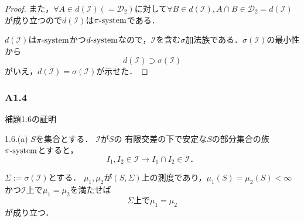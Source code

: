 \documentclass{jsarticle}
\begin{document}
\begin{proof}
    また，$\forall A\in d(\mathcal{I})(=\mathcal{D}_2)$に対して$\forall B\in d(\mathcal{I}),A\cap B\in \mathcal{D}_2=d(\mathcal{I})$が成り立つので$d(\mathcal{I})$は$\pi{\rm \text{-}system}$である．
    
    $d(\mathcal{I})$は$\pi{\rm \text{-}system}$かつ$d{\rm \text{-}system}$なので，$\mathcal{I}$を含む$\sigma$加法族である．$\sigma(\mathcal{I})$の最小性から
    \begin{equation}
        d(\mathcal{I})\supset\sigma(\mathcal{I}) \nonumber
    \end{equation}
    がいえ，$d(\mathcal{I})=\sigma(\mathcal{I})$が示せた．
\end{proof}

\subsubsection*{A1.4}
補題1.6の証明
\begin{itembox}[]{}
 1.6.(a)
    $S$を集合とする．
    $\mathcal{I}$が$S$の
    有限交差の下で安定な$S$の部分集合の族$\pi{\rm\text{-}system}$とすると，
    \begin{equation}
        I_1,I_2\in\mathcal{I} \rightarrow I_1\cap I_2\in\mathcal{I} ． \nonumber
    \end{equation}
    
    $\Sigma:=\sigma(\mathcal{I})$とする．
    $\mu_1,\mu_2$が$(S,\Sigma)$上の測度であり，$\mu_1(S)=\mu_2(S)<\infty$かつ$\mathcal{I}上で\mu_1=\mu_2$を満たせば
    \begin{equation}
        \Sigma 上で \mu_1=\mu_2 \nonumber
    \end{equation}
    が成り立つ．
\end{itembox}
\end{document}
